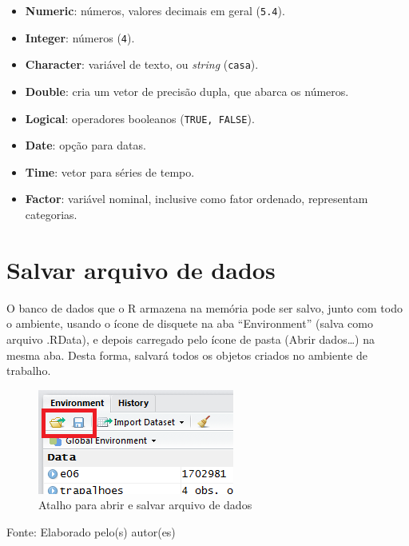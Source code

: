 \documentclass[12pt,brazil,oneside]{book}
\providecommand{\tightlist}{%
  \setlength{\itemsep}{0pt}\setlength{\parskip}{0pt}}
\begin{document}
\begin{itemize}
\tightlist
\item
  \textbf{Numeric}: números, valores decimais em geral (\texttt{5.4}).
\item
  \textbf{Integer}: números (\texttt{4}).
\item
  \textbf{Character}: variável de texto, ou \emph{string}
  (\texttt{casa}).
\item
  \textbf{Double}: cria um vetor de precisão dupla, que abarca os
  números.
\item
  \textbf{Logical}: operadores booleanos (\texttt{TRUE,\ FALSE}).
\item
  \textbf{Date}: opção para datas.
\item
  \textbf{Time}: vetor para séries de tempo.
\item
  \textbf{Factor}: variável nominal, inclusive como fator ordenado,
  representam categorias.
\end{itemize}

\hypertarget{salvar-arquivo-de-dados}{%
\section{Salvar arquivo de dados}\label{salvar-arquivo-de-dados}}

O banco de dados que o R armazena na memória pode ser salvo, junto com
todo o ambiente, usando o ícone de disquete na aba ``Environment''
(salva como arquivo .RData), e depois carregado pelo ícone de pasta
(Abrir dados\ldots{}) na mesma aba. Desta forma, salvará todos os
objetos criados no ambiente de trabalho.

\begin{figure}[H]

{\centering \includegraphics[width=0.6\linewidth]{r6} 

}

\caption{Atalho para abrir e salvar arquivo de dados}\label{fig:r6}
\end{figure}

Fonte: Elaborado pelo(s) autor(es)
\end{document}
